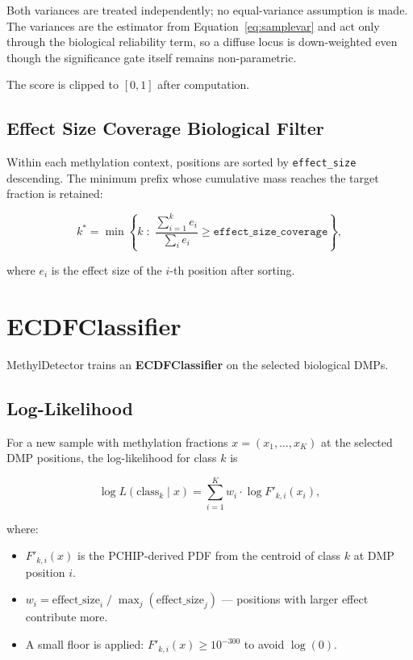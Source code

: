 \documentclass[11pt]{article}
\begin{document}
Both variances are treated independently; no equal-variance assumption is
made. The variances are the estimator from Equation~\eqref{eq:samplevar} and
act only through the biological reliability term, so a diffuse locus is
down-weighted even though the significance gate itself remains non-parametric.

The score is clipped to \([0,1]\) after computation.

\subsection{Effect Size Coverage Biological Filter}

Within each methylation context, positions are sorted by \texttt{effect\_size}
descending.  The minimum prefix whose cumulative mass reaches the target fraction
is retained:

\begin{equation}
  k^* = \min\left\{k\;:\;\frac{\sum_{i=1}^{k} e_i}{\sum_{i} e_i}
                   \geq \texttt{effect\_size\_coverage}\right\},
\end{equation}

where \(e_i\) is the effect size of the \(i\)-th position after sorting.

\section{ECDFClassifier}
\label{sec:classifier}

MethylDetector trains an \textbf{ECDFClassifier} on the selected biological DMPs.

\subsection{Log-Likelihood}

For a new sample with methylation fractions \(x = (x_1,\ldots,x_K)\) at the
selected DMP positions, the log-likelihood for class \(k\) is

\begin{equation}
  \log L(\text{class}_k \mid x)
  = \sum_{i=1}^{K} w_i \cdot \log F'_{k,i}(x_i),
  \label{eq:loglik}
\end{equation}

where:
\begin{itemize}
  \item \(F'_{k,i}(x)\) is the PCHIP-derived PDF from the centroid of
        class \(k\) at DMP position \(i\).
  \item \(w_i = \mathrm{effect\_size}_i \;/\; \max_j(\mathrm{effect\_size}_j)\)
        --- positions with larger effect contribute more.
  \item A small floor is applied: \(F'_{k,i}(x) \geq 10^{-300}\) to
        avoid \(\log(0)\).
\end{itemize}
\end{document}
